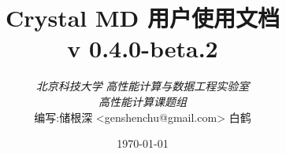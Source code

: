 \begin{titlepage}

    \title{ Crystal MD 用户使用文档 \\
            \large v 0.4.0-beta.2 }
    \author{
    \emph{北京科技大学} \emph{高性能计算与数据工程实验室} \\
    \emph{高性能计算课题组} \\[8cm]
    编写:储根深 <genshenchu@gmail.com> 白鹤 \\
    }

    \date{\today}

    \maketitle
\end{titlepage}